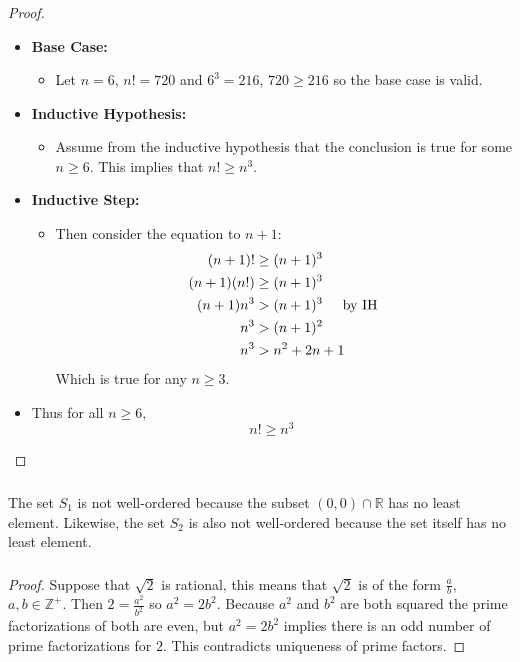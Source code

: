 \documentclass[class=article, crop=false]{standalone}
\def\reals{{\mathbb R}}
\def\integers{{\mathbb Z}}
\begin{document}
\subsubsection{}
\begin{proof}
	$ $\\
	\begin{itemize}
		\item[] \textbf{Base Case:}
		\begin{itemize}
			\item[] Let $n=6$, $n! = 720$ and $6^3=216$, $720\geq 216$ so the base case is valid.
		\end{itemize}
		\item[] \textbf{Inductive Hypothesis:}
		\begin{itemize}
			\item[] Assume from the inductive hypothesis that the conclusion is true for some $n\geq 6$.
			This implies that $n!\geq n^3$.
		\end{itemize}
		\item[] \textbf{Inductive Step:}
		\begin{itemize}
			\item[] Then consider the equation to $n+1$:
			\begin{align*}
				(n+1)! &\geq (n+1)^3 \\
				(n+1)(n!) &\geq (n+1)^3 \\
				(n+1)n^3 &> (n+1)^3 \hspace{5mm}\text{by IH} \\
				n^3 &> (n+1)^2 \\
				n^3 &> n^2 + 2n + 1
			\end{align*}
			Which is true for any $n\geq 3$.
		\end{itemize}
		\item[] Thus for all $n\geq 6$,
		$$n!\geq n^3$$
	\end{itemize}
\end{proof}

\subsubsection{}
The set $S_1$ is not well-ordered because the subset $(0,0)\cap \reals$ has no least element.
Likewise, the set $S_2$ is also not well-ordered because the set itself has no least element.

\subsubsection{}
\begin{proof}
	Suppose that $\sqrt{2}$ is rational, this means that $\sqrt{2}$ is of the form $\frac{a}{b}$, $a,b\in\integers^+$.
	Then $2=\frac{a^2}{b^2}$ so $a^2=2b^2$. Because $a^2$ and $b^2$ are both squared the prime factorizations
	of both are even, but $a^2=2b^2$ implies there is an odd number of prime factorizations for $2$. This contradicts
	uniqueness of prime factors.
\end{proof}
\end{document}
